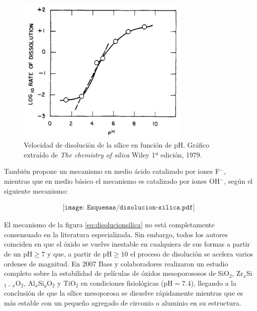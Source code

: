 			\begin{figure}[th!]
			    \begin{center}
			    \includegraphics[width=0.75\textwidth]{Graficos/disolucion_ph.jpg}
	       		\caption[Velocidad de disolución sílice en función del pH]{Velocidad de disolución de la sílice en función de pH. Gráfico extraído de \textit{The chemistry of silica} Wiley 1ª edición, 1979.\cite{iler1979}}
	         	\label{fig:disolucion_ph}
	     		\end{center}
	     		\end{figure}
	
	\pagebreak También propone un mecanismo en medio ácido catalizado por iones F$^-$, mientras que en medio básico el mecanismo es catalizado por iones OH$^-$, según el siguiente mecanismo:
		
			\begin{equation}
				\begin{aligned}
				\texttt{[image: Esquemas/disolucion-silica.pdf]}
				\label{eq:disolucionsilica}
				\end{aligned}
				\end{equation} 
	
	El mecanismo de la figura \ref{eq:disolucionsilica} no está completamente consensuado en la literatura especializada. Sin embargo, todos los autores coinciden en que el óxido se vuelve inestable en cualquiera de sus formas a partir de un $\text{pH}\geq7$ y que, a partir de $\text{pH}\geq10$ el proceso de disolución se acelera varios ordenes de magnitud.\cite{Kosmulski2002,Kosmulski2014,Schwarz1984,Si-HanWu2013,iler1979} En 2007 Bass y colaboradores\cite{bass2007} realizaron un estudio completo sobre la estabilidad de películas de óxidos mesoporososos de SiO$_2$, Zr$_x$Si$_{1-x}$O$_2$, Al$_x$Si$_y$O$_2$ y TiO$_2$ en condiciones fisiológicas (pH$=7.4$), llegando a la conclusión de que la sílice mesoporosa se disuelve rápidamente mientras que es más estable con un pequeño agregado de circonio o aluminio en su estructura.	

